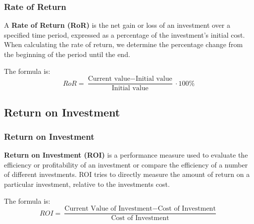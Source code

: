 \documentclass{beamer}
\begin{document}
\begin{frame}
\frametitle{\textbf{Rate of Return}}

\begin{definition}
\justifying
A \textbf{Rate of Return (RoR)} is the net gain or loss of an investment over a specified time period, expressed as a percentage of the investment's initial cost. When calculating the rate of return, we determine the percentage change from the beginning of the period until the end.
\end{definition}

\vspace{0.4cm}
\begin{block}
\justifying
The formula is:
$$
RoR = \frac{\text{Current value} - \text{Initial value}}{\text{Initial value}} \cdot 100\%
$$
\end{block}


\end{frame}






\subsection{Return on Investment}

\begin{frame}
\frametitle{\textbf{Return on Investment}}

\begin{definition}
\justifying
\textbf{Return on Investment (ROI)} is a performance measure used to evaluate the efficiency or profitability of an investment or compare the efficiency of a number of different investments. ROI tries to directly measure the amount of return on a particular investment, relative to the investments cost.
\end{definition}


\vspace{0.4cm}
\begin{block}
\justifying
The formula is:
$$
ROI = \frac{\text{Current Value of Investment} - \text{Cost of Investment}}{\text{Cost of Investment}}
$$
\end{block}

\end{frame}
\end{document}
